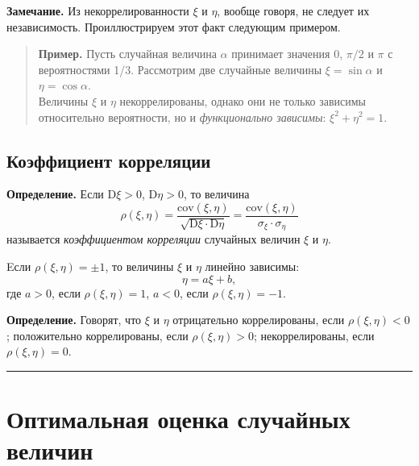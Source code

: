 \documentclass[11pt,a4paper]{article}
\begin{document}
\textbf{Замечание.} Из некоррелированности \(\xi\) и \(\eta\), вообще
говоря, не следует их независимость. Проиллюстрируем этот факт следующим
примером.

\begin{quote}
\textbf{Пример.} Пусть случайная величина \(\alpha\) принимает значения
0, \(\pi/2\) и \(\pi\) с вероятностями 1/3. Рассмотрим две случайные
величины \(\xi = \sin \alpha\) и \(\eta = \cos \alpha\).\\
Величины \(\xi\) и \(\eta\) некоррелированы, однако они не только
зависимы относительно вероятности, но и \emph{функционально зависимы}:
\(\xi^2 + \eta^2 = 1\).
\end{quote}

    \hypertarget{ux43aux43eux44dux444ux444ux438ux446ux438ux435ux43dux442-ux43aux43eux440ux440ux435ux43bux44fux446ux438ux438}{%
\subsection{Коэффициент
корреляции}\label{ux43aux43eux44dux444ux444ux438ux446ux438ux435ux43dux442-ux43aux43eux440ux440ux435ux43bux44fux446ux438ux438}}

\textbf{Определение.} Если \(\mathrm{D}\xi > 0\),
\(\mathrm{D}\eta > 0\), то величина \[
    \rho(\xi, \eta) = \dfrac{\mathrm{cov}(\xi, \eta)}{\sqrt{\mathrm{D}\xi \cdot \mathrm{D}\eta}} = \dfrac{\mathrm{cov}(\xi, \eta)}{\sigma_\xi \cdot \sigma_\eta}
\] называется \emph{коэффициентом корреляции} случайных величин \(\xi\)
и \(\eta\).

Eсли \(\rho(\xi, \eta) = \pm 1\), то величины \(\xi\) и \(\eta\) линейно
зависимы: \[ \eta =a \xi + b, \] где \(a>0\), если
\(\rho(\xi, \eta) = 1\), \(a<0\), если \(\rho(\xi, \eta) = -1\).

\textbf{Определение.} Говорят, что \(\xi\) и \(\eta\) отрицательно
коррелированы, если \(\rho(\xi, \eta) < 0\); положительно коррелированы,
если \(\rho(\xi, \eta) > 0\); некоррелированы, если
\(\rho(\xi, \eta) = 0\).

    \begin{center}\rule{0.5\linewidth}{\linethickness}\end{center}

    \hypertarget{ux43eux43fux442ux438ux43cux430ux43bux44cux43dux430ux44f-ux43eux446ux435ux43dux43aux430-ux441ux43bux443ux447ux430ux439ux43dux44bux445-ux432ux435ux43bux438ux447ux438ux43d}{%
\section{Оптимальная оценка случайных
величин}\label{ux43eux43fux442ux438ux43cux430ux43bux44cux43dux430ux44f-ux43eux446ux435ux43dux43aux430-ux441ux43bux443ux447ux430ux439ux43dux44bux445-ux432ux435ux43bux438ux447ux438ux43d}}
\end{document}
